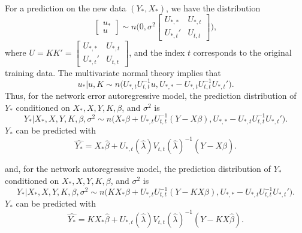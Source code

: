 \documentclass[times, doublespace]{auth}
\begin{document}
For a prediction on the new data $(Y_{*},X_{*})$, we have the distribution
\[
\begin{bmatrix} u_{*}\\u\end{bmatrix} \sim n\Bigg(0, \sigma^{2}\begin{bmatrix} U_{*,*} & U_{*,t}\\ U_{*,t}' & U_{t,t}\end{bmatrix}\Bigg),
\]
where $U = KK' = \begin{bmatrix} U_{*,*} & U_{*,t}\\ U_{*,t}' & U_{t,t}\end{bmatrix}$, and the index $t$ corresponds to the original training data. The multivariate normal theory implies that
\[
u_{*} \big\vert u, K \sim n\big(U_{*,t}U_{t,t}^{-1}u, U_{*,*} - U_{*,t}U_{t,t}^{-1}U_{*,t}'\big).
\]
Thus, for the network error autoregressive model, the prediction distribution of $Y_{*}$ conditioned on $X_{*}, X, Y, K, \beta$, and $\sigma^{2}$ is
\[
Y_{*} \big\vert X_{*}, X, Y, K, \beta, \sigma^{2} \sim n\bigg(X_{*}\beta + U_{*,t}U_{t,t}^{-1}(Y-X\beta), U_{*,*} - U_{*,t}U_{t,t}^{-1}U_{*,t}'\bigg).
\]
$Y_{*}$ can be predicted with 
\begin{equation}
\label{eqn: 14}
\hat{Y_{*}} = X_{*}\hat{\beta} + U_{*,t}(\hat{\lambda})V_{t,t}(\hat{\lambda})^{-1}(Y-X\hat{\beta}).
\end{equation}

\noindent and, for the network autoregressive model, the prediction distribution of $Y_{*}$ conditioned on $X_{*}, X, Y, K, \beta$, and $\sigma^{2}$ is
\[
Y_{*} \big\vert X_{*}, X, Y, K, \beta, \sigma^{2} \sim n\bigg(KX_{*}\beta + U_{*,t}U_{t,t}^{-1}(Y-KX\beta), U_{*,*} - U_{*,t}U_{t,t}^{-1}U_{*,t}'\bigg).
\]
$Y_{*}$ can be predicted with 
\begin{equation}
\label{eqn: 14}
\hat{Y_{*}} = KX_{*}\hat{\beta} + U_{*,t}(\hat{\lambda})V_{t,t}(\hat{\lambda})^{-1}(Y-KX\hat{\beta}).
\end{equation}
\end{document}

